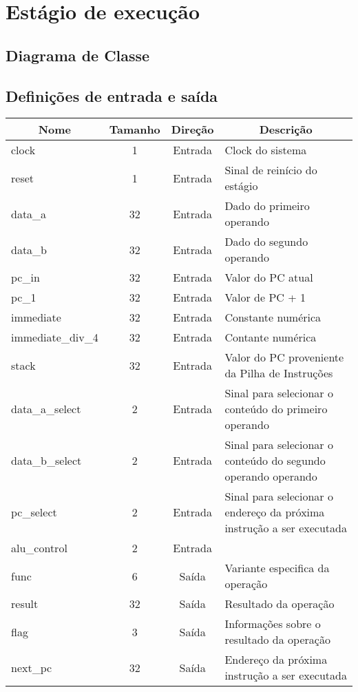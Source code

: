 \section{Estágio de execução}
	\subsection{Diagrama de Classe}
  \begin{figure}[h]
    
  \end{figure}
		
		\subsection{Definições de entrada e saída}
		
	\begin{center}
		\begin{longtable}[pos]{| l | c | c | m{7cm} |} \hline
			\multicolumn{1}{|c|}{\cellcolor[gray]{0.9}\textbf{Nome}} & 
			\multicolumn{1}{c|}{\cellcolor[gray]{0.9}\textbf{Tamanho}} & 
			\multicolumn{1}{c|}{\cellcolor[gray]{0.9}\textbf{Direção}} &
			\multicolumn{1}{c|}{\cellcolor[gray]{0.9}\textbf{Descrição}} \\ \hline
			\endhead
			\hline
			\endlastfoot

			clock & 1 & Entrada & Clock do sistema \\ \hline
			reset & 1 & Entrada & Sinal de reinício do estágio\\ \hline
			data\_a & 32 & Entrada & Dado do primeiro operando \\ \hline
			data\_b & 32 & Entrada & Dado do segundo operando \\ \hline
			pc\_in & 32 & Entrada & Valor do PC atual \\ \hline
			pc\_1 & 32 & Entrada & Valor de PC + 1\\ \hline
			immediate & 32 & Entrada & Constante numérica  \\ \hline
			immediate\_div\_4 & 32 & Entrada & Contante numérica \\\hline
			stack & 32 & Entrada & Valor do PC proveniente da Pilha de Instruções \\\hline
			data\_a\_select & 2 & Entrada & Sinal para selecionar o conteúdo do primeiro operando \\\hline
			data\_b\_select & 2 & Entrada & Sinal para selecionar o conteúdo do segundo operando operando \\\hline
			pc\_select & 2 & Entrada & Sinal para selecionar o endereço da próxima instrução a ser executada \\\hline
			alu\_control & 2 & Entrada & \\\hline
			func & 6 & Saída & Variante especifica da operação \\\hline
			result & 32 & Saída & Resultado da operação \\\hline
			flag & 3 & Saída & Informações sobre o resultado da operação \\\hline
			next\_pc & 32 & Saída & Endereço da próxima instrução a ser executada\\\hline
			

\end{longtable}
\end{center}
